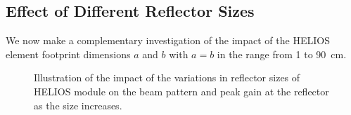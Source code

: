 \subsection{Effect of Different Reflector Sizes} \label{Variation of Element Size}
We now make a complementary investigation of the impact of the HELIOS element footprint dimensions $a$ and $b$ with $a=b$ in the range from \num{1} to \SI{90}{\centi\meter}.

\begin{figure}[tb]
	\centering
	\hfill
	\caption[Illustration of the impact of the variations in reflector sizes of HELIOS module on the beam pattern and peak gain at the reflector as the size increases.]{Illustration of the impact of the variations in reflector sizes of HELIOS module on the beam pattern and peak gain at the reflector as the size increases.}
	\label{}
\end{figure}
